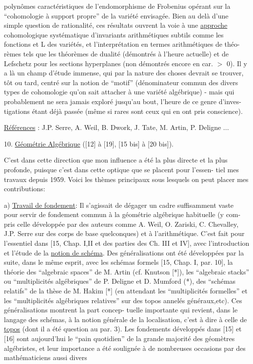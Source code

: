 
polynômes caractéristiques de l'endomorphisme de Frobenius opérant sur la
``cohomologie à support propre'' de la variété envisagée. Bien au delà d'une
simple question de rationalité, ces résultats ouvrent la voie à une \uline{approche}
cohomologique systématique d'invariants arithmétiques subtils comme les fonctions
\hand{$\zeta$} et L des variétés, et l'interprétation en termes arithmétiques de théo-%
rèmes tels que les théorèmes de dualité (démontrés à l'heure actuelle) et de
Lefschetz pour les sections hyperplanes (non démontrés encore en car. $>$ 0). Il
y a là un champ d'étude immense, qui par la nature des choses devrait se trouver,
tôt ou tard, centré sur la notion de ``motif'' (dénominateur commun des divers
types de cohomologie qu'on sait attacher à une variété algébrique) - mais qui
probablement ne sera jamais exploré jusqu'au bout, l'heure de ce genre d'inves-%
tigations étant déjà passée (même si rares sont ceux qui en ont pris conscience).

\uline{Références} : J.P. Serre, A. Weil, B. Dwork, J. Tate, M. Artin, P. Deligne ...

10. \uline{Géométrie Algébrique} ([12] à [19], [15 bis] à [20 bis]).

C'est dans cette direction que mon influence a été la plus directe et
la plus profonde, puisque c'est dans cette optique que se placent pour l'essen-%
tiel mes travaux depuis 1959. Voici les thèmes principaux sous lesquels on peut
placer mes contributions:

a) \uline{Travail de fondement}: Il s'agissait de dégager un cadre suffisamment vaste
pour servir de fondement commun à la géométrie algébrique habituelle (y com-%
pris celle développée par des auteurs comme A. Weil, O. Zariski, C. Chevalley,
J.P. Serre sur des corps de base quelconques) et à l'arithmétique. C'est fait
pour l'essentiel dans [15, Chap. I,II et des parties des Ch. III et IV], avec
l'introduction et l'étude de la \uline{notion de schéma}. Des généralisations ont été
développées par la suite, dans le même esprit, avec les schémas formels [15,
Chap. I, par. 10], la théorie des ``algebraic spaces'' de M. Artin (cf. Knutson
[*]), les ``algebraic stacks'' ou ``multiplicités algébriques'' de P. Deligne et
D. Mumford (*), des ``schémas relatifs'' de la thèse de M. Hakim [*] (en attendant
les ``multiplicités formelles'' et les ``multiplicités algébriques relatives'' sur
des topos annelés généraux,etc). Ces généralisations montrent la part concep-%
tuelle importante qui revient, dans le langage des schémas, à la notion générale
de la localisation, c'est à dire à celle de \uline{topos} (dont il a été question au
par. 3). Les fondements développés dans [15] et [16] sont aujourd'hui le ``pain
quotidien'' de la grande majorité des géomètres algébristes, et leur importance
a été soulignée à de nombreuses occasions par des mathématiciens aussi divers

